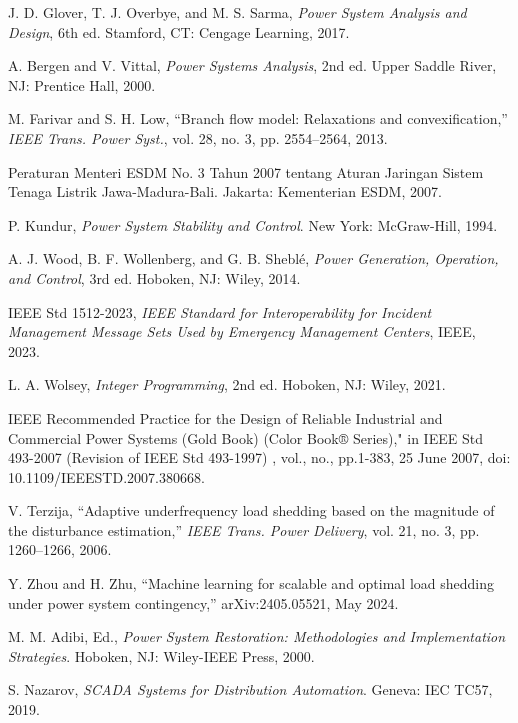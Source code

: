 J. D. Glover, T. J. Overbye, and M. S. Sarma, \emph{Power System Analysis and Design}, 6th ed. Stamford, CT: Cengage Learning, 2017.

A. Bergen and V. Vittal, \emph{Power Systems Analysis}, 2nd ed. Upper Saddle River, NJ: Prentice Hall, 2000.

M. Farivar and S. H. Low, ``Branch flow model: Relaxations and convexification,'' \emph{IEEE Trans. Power Syst.}, vol. 28, no. 3, pp. 2554--2564, 2013.

Peraturan Menteri ESDM No. 3 Tahun 2007 tentang Aturan Jaringan Sistem Tenaga Listrik Jawa-Madura-Bali. Jakarta: Kementerian ESDM, 2007.

P. Kundur, \emph{Power System Stability and Control}. New York: McGraw-Hill, 1994.

A. J. Wood, B. F. Wollenberg, and G. B. Sheblé, \emph{Power Generation, Operation, and Control}, 3rd ed. Hoboken, NJ: Wiley, 2014.

IEEE Std 1512-2023, \emph{IEEE Standard for Interoperability for Incident Management Message Sets Used by Emergency Management Centers}, IEEE, 2023.

L. A. Wolsey, \emph{Integer Programming}, 2nd ed. Hoboken, NJ: Wiley, 2021.

IEEE Recommended Practice for the Design of Reliable Industrial and Commercial Power Systems (Gold Book) (Color Book® Series)," in IEEE Std 493-2007 (Revision of IEEE Std 493-1997) , vol., no., pp.1-383, 25 June 2007, doi: 10.1109/IEEESTD.2007.380668.

V. Terzija, ``Adaptive underfrequency load shedding based on the magnitude of the disturbance estimation,'' \emph{IEEE Trans. Power Delivery}, vol. 21, no. 3, pp. 1260--1266, 2006.

Y. Zhou and H. Zhu, ``Machine learning for scalable and optimal load shedding under power system contingency,'' arXiv:2405.05521, May 2024.

M. M. Adibi, Ed., \emph{Power System Restoration: Methodologies and Implementation Strategies}. Hoboken, NJ: Wiley-IEEE Press, 2000.

S. Nazarov, \emph{SCADA Systems for Distribution Automation}. Geneva: IEC TC57, 2019.

